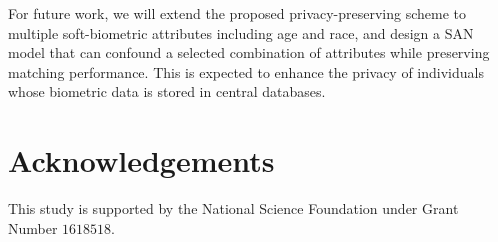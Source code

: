 \documentclass[10pt,twocolumn,letterpaper]{article}
\begin{document}
For future work, we will extend the proposed privacy-preserving scheme to multiple soft-biometric attributes including age and race, and design a SAN model that can confound a selected combination of attributes while preserving matching performance.  This is expected to enhance the privacy of individuals whose biometric data is stored in central databases. %

\section{Acknowledgements}

This study is supported by the National Science Foundation under Grant Number $1618518$.

{\small

\balance

}
\end{document}
